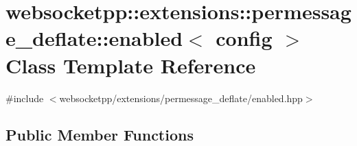 \hypertarget{classwebsocketpp_1_1extensions_1_1permessage__deflate_1_1enabled}{}\section{websocketpp\+:\+:extensions\+:\+:permessage\+\_\+deflate\+:\+:enabled$<$ config $>$ Class Template Reference}
\label{classwebsocketpp_1_1extensions_1_1permessage__deflate_1_1enabled}


{\ttfamily \#include $<$websocketpp/extensions/permessage\+\_\+deflate/enabled.\+hpp$>$}

\subsection*{Public Member Functions}
